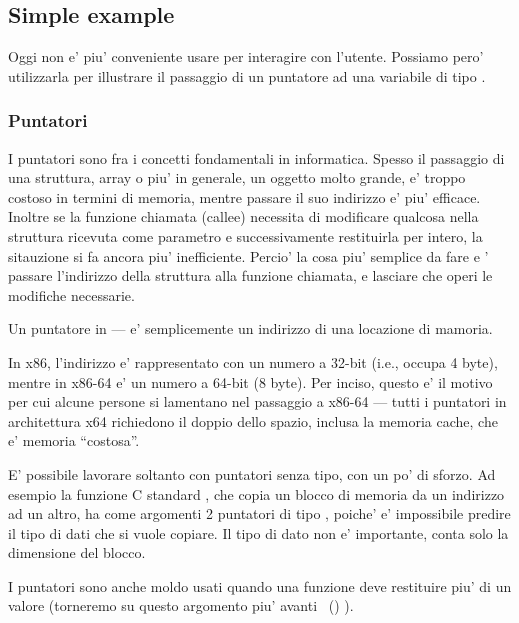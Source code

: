 \subsection{Simple example}



Oggi non e' piu' conveniente usare \scanf per interagire con l'utente. 
Possiamo pero' utilizzarla per illustrare il passaggio di un puntatore ad una variabile di tipo \Tint.

\subsubsection{Puntatori}
\myindex{\CLanguageElements!\Pointers}

I puntatori sono fra i concetti fondamentali in informatica.
Spesso il passaggio di una struttura, array o piu' in generale, un oggetto molto grande, e' troppo costoso in termini di memoria, mentre passare il suo indirizzo e' piu' efficace. 
Inoltre se la funzione chiamata (\gls{callee}) necessita di modificare qualcosa nella struttura ricevuta come parametro e successivamente restituirla per intero, la sitauzione si fa ancora piu' inefficiente.
Percio' la cosa piu' semplice da fare e ' passare l'indirizzo della struttura alla funzione chiamata, e lasciare che operi le modifiche necessarie.

Un puntatore in \CCpp--- e' semplicemente un indirizzo di una locazione di mamoria.

In x86, l'indirizzo e' rappresentato con un numero a 32-bit (i.e., occupa 4 byte), mentre in x86-64 e' un numero a 64-bit (8 byte).
Per inciso, questo e' il motivo per cui alcune persone si lamentano nel passaggio a x86-64 --- tutti i puntatori in architettura x64 richiedono il doppio dello spazio, inclusa la memoria cache, che e' memoria ``costosa''.

E' possibile lavorare soltanto con puntatori senza tipo, con un po' di sforzo. Ad esempio la funzione C standard , che copia un blocco di memoria da un indirizzo ad un altro, ha come argomenti 2 puntatori di tipo , poiche' e' impossibile predire il tipo di dati che si vuole copiare. Il tipo di dato non e' importante, conta solo la dimensione del blocco.

I puntatori sono anche moldo usati quando una funzione deve restituire piu' di un valore
(torneremo su questo argomento piu' avanti
~()
).

